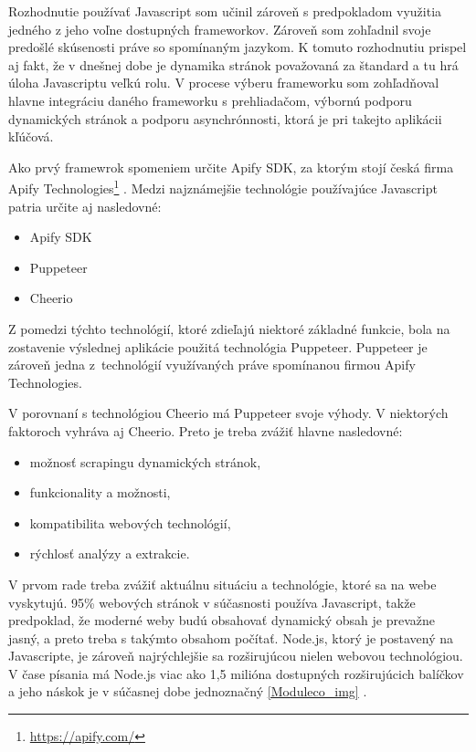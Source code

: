 \bigskip

Rozhodnutie používať Javascript som učinil zároveň s predpokladom využitia jedného z jeho voľne dostupných frameworkov. Zároveň som zohľadnil svoje predošlé skúsenosti práve so spomínaným jazykom. K tomuto rozhodnutiu prispel aj fakt, že v dnešnej dobe je dynamika stránok považovaná za štandard a tu hrá úloha Javascriptu veľkú rolu. V procese výberu frameworku som zohľadňoval hlavne integráciu daného frameworku s prehliadačom, výbornú podporu dynamických stránok a podporu asynchrónnosti, ktorá je pri takejto aplikácii kľúčová.

Ako prvý framewrok spomeniem určite Apify SDK, za ktorým stojí česká firma Apify Technologies\footnote{{\url{https://apify.com/}}} \cite{JanCurna:online}. Medzi najznámejšie technológie používajúce Javascript patria určite aj nasledovné:

\begin{itemize}
    \item {Apify SDK}
    \item {Puppeteer}
    \item {Cheerio}
\end{itemize}

Z pomedzi týchto technológií, ktoré zdieľajú niektoré základné funkcie, bola na zostavenie výslednej aplikácie použitá technológia Puppeteer. Puppeteer je zároveň jedna z~technológií využívaných práve spomínanou firmou Apify Technologies. 

V porovnaní s technológiou Cheerio má Puppeteer svoje výhody. V niektorých faktoroch vyhráva aj Cheerio. Preto je treba zvážiť hlavne nasledovné:

\begin{itemize}
    \item možnosť scrapingu dynamických stránok,
    \item funkcionality a možnosti,
    \item kompatibilita webových technológií,
    \item rýchlosť analýzy a extrakcie.
\end{itemize}

V prvom rade treba zvážiť aktuálnu situáciu a technológie, ktoré sa na webe vyskytujú. 95\% webových stránok v súčasnosti používa Javascript, takže predpoklad, že moderné weby budú obsahovať dynamický obsah je prevažne jasný, a preto treba s takýmto obsahom počítať. Node.js, ktorý je postavený na Javascripte, je zároveň najrýchlejšie sa rozširujúcou nielen webovou technológiou. V čase písania má Node.js viac ako 1,5 milióna dostupných rozširujúcich balíčkov a jeho náskok je v súčasnej dobe jednoznačný \ref{Moduleco_img} \cite{HowPopular}. 

